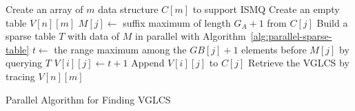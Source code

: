 \begin{algorithm}
\SetAlgoNoLine
{}
    
Create an array of $m$ data structure $C[m]$ to support ISMQ \;
Create an empty table $V[n][m]$ \;
 {
   {
    $M[j] \gets$ suffix maximum of length $G_A + 1$ from $C[j]$ \;
  }
  Build a sparse table $T$ with data of $M$ in parallel with Algorithm~\ref{alg:parallel-sparse-table}\; 
   {
     {
        $t \gets $ the range maximum among the $GB[j] + 1$ elements before $M[j]$ by querying $T$ \;
        $V[i][j] \gets t + 1$ \;
        Append $V[i][j]$ to $C[j]$ \;
    }
  }
}
Retrieve the VGLCS by tracing $V[n][m]$ \;
  \caption{Parallel Algorithm for Finding VGLCS}
  \label{alg:parallel-VGLCS}
\end{algorithm}
